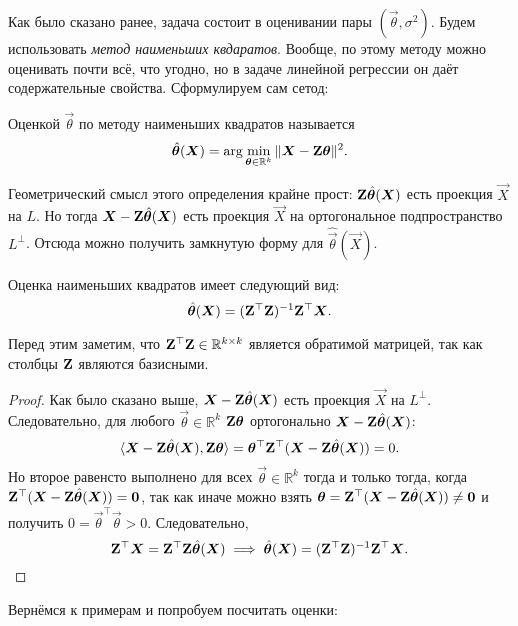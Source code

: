 Как было сказано ранее, задача состоит в оценивании пары $(\vec{\theta}, \sigma^{2})$. Будем использовать \emph{метод наименьших квдаратов}. Вообще, по этому методу можно оценивать почти всё, что угодно, но в задаче линейной регрессии он даёт содержательные свойства. Сформулируем сам сетод:
\begin{definition}
	Оценкой $\vec{\theta}$ по методу наименьших квадратов называется 
	\[
		\hat{\bm{\theta}}(\bm{X}) = \arg\min_{\bm{\theta} \in \mathbb{R}^{k}} \|\bm{X} - \mathbf{Z}\bm{\theta}\|^{2}.
	\]
\end{definition}
Геометрический смысл этого определения крайне прост: $\mathbf{Z}\hat{\bm{\theta}}(\bm{X})$ есть проекция $\vec{X}$ на $L$. Но тогда $\bm{X} - \mathbf{Z}\hat{\bm{\theta}}(\bm{X})$ есть проекция $\vec{X}$ на ортогональное подпространство $L^{\perp}$. Отсюда можно получить замкнутую форму для $\hat{\vec{\theta}}(\vec{X})$.
\begin{lemma}
	Оценка наименьших квадратов имеет следующий вид:
	\[
		\hat{\bm{\theta}}(\bm{X}) = (\mathbf{Z}^{\top}\mathbf{Z})^{-1}\mathbf{Z}^{\top}\bm{X}.
	\]
\end{lemma}
Перед этим заметим, что $\mathbf{Z}^{\top}\mathbf{Z} \in \mathbb{R}^{k \times k}$ является обратимой матрицей, так как столбцы $\mathbf{Z}$ являются базисными.
\begin{proof}
	Как было сказано выше, $\bm{X} - \mathbf{Z}\hat{\bm{\theta}}(\bm{X})$ есть проекция $\vec{X}$ на $L^{\perp}$. Следовательно, для любого $\vec{\theta} \in \mathbb{R}^{k}$ $\mathbf{Z}\bm{\theta}$ ортогонально $\bm{X} - \mathbf{Z}\hat{\bm{\theta}}(\bm{X})$:
	\[
		\langle \bm{X} - \mathbf{Z}\hat{\bm{\theta}}(\bm{X}), \mathbf{Z}\bm{\theta} \rangle = \bm{\theta}^{\top}\mathbf{Z}^{\top}(\bm{X} - \mathbf{Z}\hat{\bm{\theta}}(\bm{X})) = 0.
	\]
	Но второе равенсто выполнено для всех $\vec{\theta} \in \mathbb{R}^{k}$ тогда и только тогда, когда $\mathbf{Z}^{\top}(\bm{X} - \mathbf{Z}\hat{\bm{\theta}}(\bm{X})) = \bm{0}$, так как иначе можно взять $\bm{\theta} = \mathbf{Z}^{\top}(\bm{X} - \mathbf{Z}\hat{\bm{\theta}}(\bm{X})) \neq \bm{0}$ и получить $0 = \vec{\theta}^{\top}\vec{\theta} > 0$. Следовательно,
	\[
		\mathbf{Z}^{\top}\bm{X} = \mathbf{Z}^{\top}\mathbf{Z}\hat{\bm{\theta}}(\bm{X}) \implies \hat{\bm{\theta}}(\bm{X}) = (\mathbf{Z}^{\top}\mathbf{Z})^{-1}\mathbf{Z}^{\top}\bm{X}. \qedhere
	\]
\end{proof}
Вернёмся к примерам и попробуем посчитать оценки:
